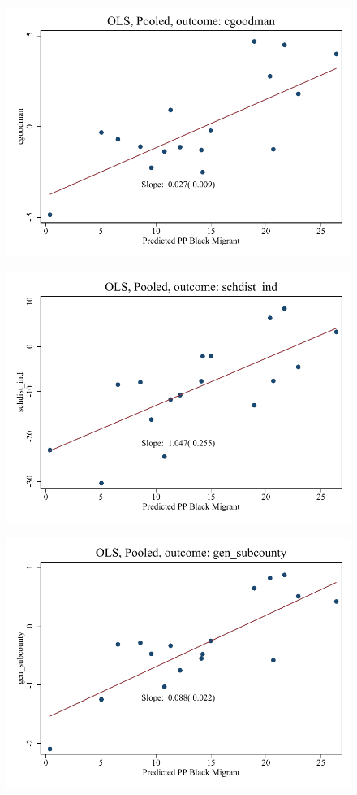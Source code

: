 \documentclass{article}
\begin{document}
\clearpage
\begin{figure}
	\centering
	\includegraphics[width=.8\textwidth]{figures/binscatter/pooled_cgoodman_ols.pdf}
\end{figure}
\clearpage
\begin{figure}
	\centering
	\includegraphics[width=.8\textwidth]{figures/binscatter/pooled_schdist_ind_ols.pdf}
\end{figure}
\clearpage
\begin{figure}
	\centering
	\includegraphics[width=.8\textwidth]{figures/binscatter/pooled_gen_subcounty_ols.pdf}
\end{figure}
\end{document}
